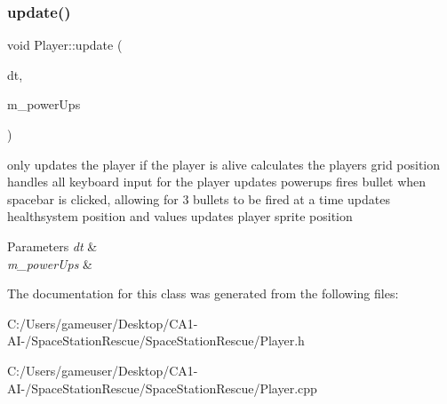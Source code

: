 \subsubsection{\texorpdfstring{update()}{update()}}
{\footnotesize\ttfamily void Player\+::update (\begin{DoxyParamCaption}\item[{double}]{dt,  }\item[{std\+::vector$<$ \mbox{\hyperlink{class_powerups}{Powerups}} $\ast$ $>$ \&}]{m\+\_\+power\+Ups }\end{DoxyParamCaption})}



only updates the player if the player is alive calculates the players grid position handles all keyboard input for the player updates powerups fires bullet when spacebar is clicked, allowing for 3 bullets to be fired at a time updates healthsystem position and values updates player sprite position 


\begin{DoxyParams}{Parameters}
{\em dt} & \\
\hline
{\em m\+\_\+power\+Ups} & \\
\hline
\end{DoxyParams}


The documentation for this class was generated from the following files\+:\begin{DoxyCompactItemize}
\item 
C\+:/\+Users/gameuser/\+Desktop/\+C\+A1-\/\+A\+I-\//\+Space\+Station\+Rescue/\+Space\+Station\+Rescue/Player.\+h\item 
C\+:/\+Users/gameuser/\+Desktop/\+C\+A1-\/\+A\+I-\//\+Space\+Station\+Rescue/\+Space\+Station\+Rescue/Player.\+cpp\end{DoxyCompactItemize}

